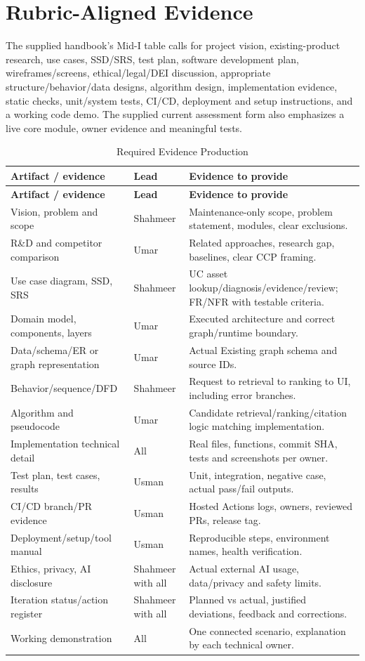 \documentclass[11pt,a4paper,oneside]{report}
\begin{document}
\section{Rubric-Aligned Evidence}
The supplied handbook's Mid-I table calls for project vision, existing-product research, use cases, SSD/SRS, test plan, software development plan, wireframes/screens, ethical/legal/DEI discussion, appropriate structure/behavior/data designs, algorithm design, implementation evidence, static checks, unit/system tests, CI/CD, deployment and setup instructions, and a working code demo. The supplied current assessment form also emphasizes a live core module, owner evidence and meaningful tests.

\begin{longtable}{P{4.2cm}P{2.0cm}P{5.2cm}}
\caption{Required Evidence Production}\\\toprule\textbf{Artifact / evidence} & \textbf{Lead} & \textbf{Evidence to provide}\\\midrule\endfirsthead\toprule\textbf{Artifact / evidence} & \textbf{Lead} & \textbf{Evidence to provide}\\\midrule\endhead
Vision, problem and scope & Shahmeer & Maintenance-only scope, problem statement, modules, clear exclusions.\\
R\&D and competitor comparison & Umar & Related approaches, research gap, baselines, clear CCP framing.\\
Use case diagram, SSD, SRS & Shahmeer & UC asset lookup/diagnosis/evidence/review; FR/NFR with testable criteria.\\
Domain model, components, layers & Umar & Executed architecture and correct graph/runtime boundary.\\
Data/schema/ER or graph representation & Umar & Actual Existing graph schema and source IDs.\\
Behavior/sequence/DFD & Shahmeer & Request to retrieval to ranking to UI, including error branches.\\
Algorithm and pseudocode & Umar & Candidate retrieval/ranking/citation logic matching implementation.\\
Implementation technical detail & All & Real files, functions, commit SHA, tests and screenshots per owner.\\
Test plan, test cases, results & Usman & Unit, integration, negative case, actual pass/fail outputs.\\
CI/CD branch/PR evidence & Usman & Hosted Actions logs, owners, reviewed PRs, release tag.\\
Deployment/setup/tool manual & Usman & Reproducible steps, environment names, health verification.\\
Ethics, privacy, AI disclosure & Shahmeer with all & Actual external AI usage, data/privacy and safety limits.\\
Iteration status/action register & Shahmeer with all & Planned vs actual, justified deviations, feedback and corrections.\\
Working demonstration & All & One connected scenario, explanation by each technical owner.\\
\bottomrule\end{longtable}
\end{document}
